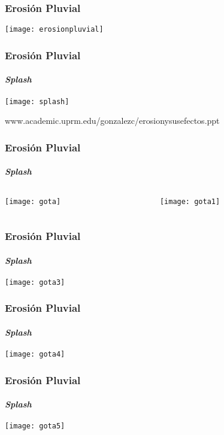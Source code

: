 \documentclass{beamer}
\begin{document}
\begin{frame}
\frametitle{Erosión Pluvial}
\begin{center}
\texttt{[image: erosionpluvial]}
\end{center}
\end{frame}
\begin{frame}
\frametitle{Erosión Pluvial}
\framesubtitle{\it{Splash}}
\begin{center}
\texttt{[image: splash]}
\end{center}
\tiny{www.academic.uprm.edu/gonzalezc/erosionysusefectos.ppt}
\end{frame}
\begin{frame}
\frametitle{Erosión Pluvial}
\framesubtitle{\it{Splash}}
\begin{columns}
\begin{column}{0.5\linewidth}
\begin{center}
\texttt{[image: gota]}
\end{center}
\end{column}
\begin{column}{0.5\linewidth}
\begin{center}
\texttt{[image: gota1]}
\end{center}
\end{column}
\end{columns}
\end{frame}
\begin{frame}
\frametitle{Erosión Pluvial}
\framesubtitle{\it{Splash}}
\begin{center}
\texttt{[image: gota3]}
\end{center}
\end{frame}
\begin{frame}
\frametitle{Erosión Pluvial}
\framesubtitle{\it{Splash}}
\begin{center}
\texttt{[image: gota4]}
\end{center}
\end{frame}
\begin{frame}
\frametitle{Erosión Pluvial}
\framesubtitle{\it{Splash}}
\begin{center}
\texttt{[image: gota5]}
\end{center}
\end{frame}
\end{document}
